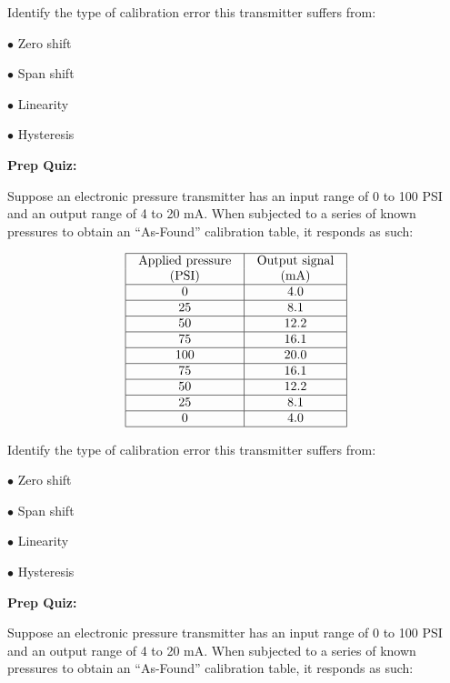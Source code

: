 \vskip 10pt

Identify the type of calibration error this transmitter suffers from:

\medskip
\item{$\bullet$} Zero shift
\vskip 5pt 
\item{$\bullet$} Span shift
\vskip 5pt 
\item{$\bullet$} Linearity
\vskip 5pt 
\item{$\bullet$} Hysteresis
\medskip



\vfil \eject

\noindent
{\bf Prep Quiz:}

Suppose an electronic pressure transmitter has an input range of 0 to 100 PSI and an output range of 4 to 20 mA.  When subjected to a series of known pressures to obtain an ``As-Found'' calibration table, it responds as such:


$$\vbox{\offinterlineskip
\halign{\strut
\vrule \quad\hfil # \ \hfil & 
\vrule \quad\hfil # \ \hfil \vrule \cr
\noalign{\hrule}
%
Applied pressure & Output signal \cr
%
(PSI) & (mA) \cr
%
\noalign{\hrule}
%
0 & 4.0 \cr
%
\noalign{\hrule}
%
25 & 8.1 \cr
%
\noalign{\hrule}
%
50 & 12.2 \cr
%
\noalign{\hrule}
%
75 & 16.1 \cr
%
\noalign{\hrule}
%
100 & 20.0 \cr
%
\noalign{\hrule}
%
75 & 16.1 \cr
%
\noalign{\hrule}
%
50 & 12.2 \cr
%
\noalign{\hrule}
%
25 & 8.1 \cr
%
\noalign{\hrule}
%
0 & 4.0 \cr
%
\noalign{\hrule}
} %
}$$ %

\vskip 10pt

Identify the type of calibration error this transmitter suffers from:

\medskip
\item{$\bullet$} Zero shift
\vskip 5pt 
\item{$\bullet$} Span shift
\vskip 5pt 
\item{$\bullet$} Linearity
\vskip 5pt 
\item{$\bullet$} Hysteresis
\medskip




\vfil \eject

\noindent
{\bf Prep Quiz:}

Suppose an electronic pressure transmitter has an input range of 0 to 100 PSI and an output range of 4 to 20 mA.  When subjected to a series of known pressures to obtain an ``As-Found'' calibration table, it responds as such:

